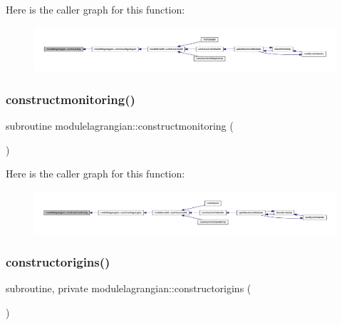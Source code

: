 Here is the caller graph for this function\+:\nopagebreak
\begin{figure}[H]
\begin{center}
\leavevmode
\includegraphics[width=350pt]{namespacemodulelagrangian_a6dace26d0d9efdc26334c8afd5ae9220_icgraph}
\end{center}
\end{figure}
\mbox{\label{namespacemodulelagrangian_af8367c0c93de5218ac9c3ef7159659cf}} 
\subsubsection{\texorpdfstring{constructmonitoring()}{constructmonitoring()}}
{\footnotesize\ttfamily subroutine modulelagrangian\+::constructmonitoring (\begin{DoxyParamCaption}{ }\end{DoxyParamCaption})\hspace{0.3cm}{\ttfamily [private]}}

Here is the caller graph for this function\+:\nopagebreak
\begin{figure}[H]
\begin{center}
\leavevmode
\includegraphics[width=350pt]{namespacemodulelagrangian_af8367c0c93de5218ac9c3ef7159659cf_icgraph}
\end{center}
\end{figure}
\mbox{\label{namespacemodulelagrangian_a18d4f1108b3f7cc2ab468c5271bc2a42}} 
\subsubsection{\texorpdfstring{constructorigins()}{constructorigins()}}
{\footnotesize\ttfamily subroutine, private modulelagrangian\+::constructorigins (\begin{DoxyParamCaption}{ }\end{DoxyParamCaption})\hspace{0.3cm}{\ttfamily [private]}}


